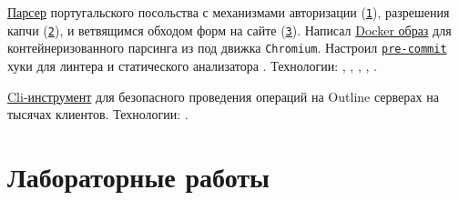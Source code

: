 \documentclass[margin,line]{resume}
\begin{document}
\begin{resume}
\begin{description}
\begin{list2}
        \item{
            \href{https://github.com/alchemmist/portu-hack}{Парсер}
            португальского посольства с механизмами авторизации
            (\href{https://github.com/alchemmist/portu-hack/blob/develop/parser/parser/searcher/auth.py}{\texttt{1}}),
            разрешения капчи
            (\href{https://github.com/alchemmist/portu-hack/blob/develop/parser/parser/searcher/captcha.py}{\texttt{2}}),
            и
            ветвящимся обходом форм на сайте
            (\href{https://github.com/alchemmist/portu-hack/blob/develop/parser/parser/searcher/snif.py}{\texttt{3}}).
            Написал
            \href{https://github.com/alchemmist/portu-hack/blob/develop/parser/Dockerfile}{Docker
            образ} для контейнеризованного парсинга
             из под движка \texttt{Chromium}.
            Настроил
            \href{https://github.com/alchemmist/portu-hack/blob/develop/pre-commit-config.yaml}{\texttt{pre-commit}}
            хуки для линтера
             и статического анализатора .
            Технологии: , ,
            ,
            ,
          .}

          \vspace{2mm}

        \item{
            \href{https://github.com/alchemmist/outline-vpn-cli}{Cli-инструмент}
            для безопасного проведения операций на
            Outline серверах на тысячах клиентов.
          Технологии: .}
        \end{list2}

    \end{description}

    \section{\mysidestyle Лабораторные работы}\vspace{2mm}

    \begin{description}


\end{description}
\end{resume}
\end{document}

